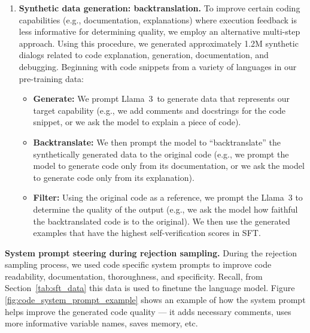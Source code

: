 \begin{enumerate}
    \item{\textbf{Synthetic data generation: backtranslation.}} To improve certain coding capabilities (e.g., documentation, explanations) where execution feedback is less informative for determining quality, we employ an alternative multi-step approach. Using this procedure, we generated approximately 1.2M synthetic dialogs related to code explanation, generation, documentation, and debugging. Beginning with code snippets from a variety of languages in our pre-training data:
    \begin{itemize}
        \item \textbf{Generate:} We prompt Llama~3~to generate data that represents our target capability (e.g., we add comments and docstrings for the code snippet, or we ask the model to explain a piece of code).
        \item \textbf{Backtranslate:} We then prompt the model to ``backtranslate'' the synthetically generated data to the original code (e.g., we prompt the model to generate code only from its documentation, or we ask the model to generate code only from its explanation).
        \item \textbf{Filter:} Using the original code as a reference, we prompt the Llama~3 to determine the quality of the output (e.g., we ask the model how faithful the backtranslated code is to the original). We then use the generated examples that have the highest self-verification scores in SFT. 
    \end{itemize}

\end{enumerate}

\textbf{System prompt steering during rejection sampling.} During the rejection sampling process, we used code specific system prompts to improve code readability, documentation, thoroughness, and specificity. Recall, from Section~\ref{tab:sft_data} this data is used to finetune the language model.  Figure \ref{fig:code_system_prompt_example} shows an example of how the system prompt helps improve the generated code quality --- it  adds necessary comments, uses more informative variable names, saves memory, etc.

